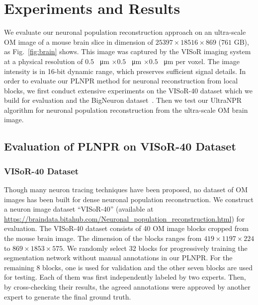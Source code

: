 \section{Experiments and Results}
\label{sec:experiments}

We evaluate our neuronal population reconstruction approach on an ultra-scale OM image of a mouse brain slice in dimension of $25397\times 18516\times 869$ ($761$ GB), as Fig.~\ref{fig:brain} shows.
%
This image was captured by the VISoR imaging system~\cite{Wang2019} at a physical resolution of $0.5$ \SI{}{\micro\metre} $\times0.5$ \SI{}{\micro\metre} $\times 0.5$ \SI{}{\micro\metre} per voxel. 
%
The image intensity is in 16-bit dynamic range, which preserves sufficient signal details.
In order to evaluate our PLNPR method for neuronal reconstruction from local blocks, we first conduct extensive experiments on the VISoR-40 dataset which we build for evaluation and the BigNeuron dataset~\cite{peng2015}. 
%
Then we test our UltraNPR algorithm for neuronal population reconstruction from the ultra-scale OM brain image.

\subsection{Evaluation of PLNPR on VISoR-40 Dataset}
\label{sec:exp_PLNPR_VISoR}

\subsubsection{VISoR-40 Dataset}
Though many neuron tracing techniques have been proposed, no dataset of OM images has been built for dense neuronal population reconstruction.
We construct a neuron image dataset ``VISoR-40'' (available at \url{https://braindata.bitahub.com/Neuronal_population_reconstruction.html}) for evaluation. 
The VISoR-40 dataset consists of 40 OM image blocks cropped from the mouse brain image. The dimension of the blocks ranges from $419 \times1197 \times 224$ to $869 \times1853 \times 575$.
%
We randomly select $32$ blocks for progressively training the segmentation network without manual annotations in our PLNPR.
%
For the remaining 8 blocks, one is used for validation and the other seven blocks are used for testing.
Each of them was first independently labeled by two experts. Then, by cross-checking their results, the agreed annotations were approved by another expert to generate the final ground truth.


